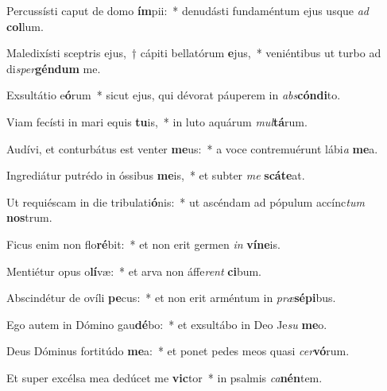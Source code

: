 \item Percussísti caput de domo \textbf{ím}pii:~* denudásti fundaméntum ejus usque \textit{ad} \textbf{col}lum.
\item Maledixísti sceptris ejus,~† cápiti bellatórum \textbf{e}jus,~* veniéntibus ut turbo ad di\textit{sper}\textbf{gén}\textbf{dum} me.
\item Exsultátio e\textbf{ó}rum~* sicut ejus, qui dévorat páuperem in \textit{abs}\textbf{cón}\textbf{di}to.
\item Viam fecísti in mari equis \textbf{tu}is,~* in luto aquárum \textit{mul}\textbf{tá}rum.
\item Audívi, et conturbátus est venter \textbf{me}us:~* a voce contremuérunt lábi\textit{a} \textbf{me}a.
\item Ingrediátur putrédo in óssibus \textbf{me}is,~* et subter \textit{me} \textbf{scá}\textbf{te}at.
\item Ut requiéscam in die tribulati\textbf{ó}nis:~* ut ascéndam ad pópulum accínc\textit{tum} \textbf{nos}trum.
\item Ficus enim non flo\textbf{ré}bit:~* et non erit germen \textit{in} \textbf{ví}\textbf{ne}is.
\item Mentiétur opus o\textbf{lí}væ:~* et arva non áffe\textit{rent} \textbf{ci}bum.
\item Abscindétur de ovíli \textbf{pe}cus:~* et non erit arméntum in \textit{præ}\textbf{sé}\textbf{pi}bus.
\item Ego autem in Dómino gau\textbf{dé}bo:~* et exsultábo in Deo Je\textit{su} \textbf{me}o.
\item Deus Dóminus fortitúdo \textbf{me}a:~* et ponet pedes meos quasi \textit{cer}\textbf{vó}rum.
\item Et super excélsa mea dedúcet me \textbf{vic}tor~* in psalmis \textit{ca}\textbf{nén}tem.
